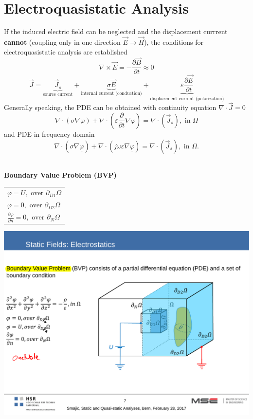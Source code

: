 \section{Electroquasistatic Analysis}
If the induced electric field can be neglected and the displacement currrent \textbf{cannot} (coupling only in one direction $\vec{E} \rightarrow \vec{H}$), the conditions for electroquasistatic analysis are established \\
\begin{equation*}
	\nabla \times \vec{E} = -\frac{\partial \vec{B}}{\partial t} \approx 0
\end{equation*}
\begin{equation*}
	\vec{J} = \underbrace{\vec{J}_s}_{\textrm{source current}} + \underbrace{\sigma \vec{E}}_{\textrm{internal current (conduction)}} + \underbrace{\varepsilon \frac{\partial \vec{E}}{\partial t}}_{\textrm{displacement current (polarization)}}
\end{equation*}
Generally speaking, the
PDE can be obtained with continuity equation $\nabla \cdot \vec{J} = 0$
\begin{equation*}
	\nabla \cdot \left(\sigma \nabla \varphi\right) + \nabla \cdot \left(\varepsilon \frac{\partial}{\partial t}\nabla \varphi\right) = \nabla \cdot \left(\vec{J}_s\right), \textrm{ in } \Omega
\end{equation*}
and PDE in frequency domain
\begin{equation*}
	\nabla \cdot \left(\sigma \nabla \underline{\varphi}\right) + \nabla \cdot \left( j \omega \varepsilon \nabla \underline{\varphi}\right) = \nabla \cdot \left(\vec{J}_s\right), \textrm{ in } \Omega.
\end{equation*}

\textbf{\\ Boundary Value Problem (BVP)\\}
\begin{minipage}[lt]{11cm}
	\begin{tabular}{l}
		\(\displaystyle \varphi = U, \textrm{ over } \partial_{D1}\Omega \) \\
		\(\displaystyle \varphi = 0, \textrm{ over } \partial_{D2}\Omega \) \\
		\(\displaystyle \frac{\partial \varphi}{\partial n} = 0, \textrm{ over } \partial_{N}\Omega \)
	\end{tabular}
\end{minipage}
\begin{minipage}[rt]{8cm}
	\includegraphics[width=.6\textwidth]{./images/BVP_electrostatic.pdf}
\end{minipage}